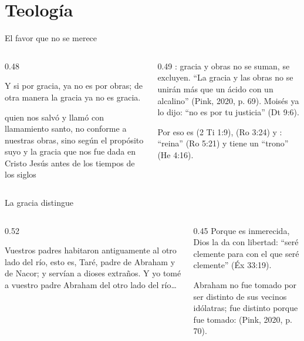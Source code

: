 \section{Teología}

\begin{frame}{El favor que no se merece}
\begin{columns}[t,onlytextwidth]
\begin{column}{0.48\textwidth}
\begin{cita}Y si por gracia, ya no es por obras; de otra manera la gracia ya no es gracia.\end{cita}
\begin{cita}quien nos salvó y llamó con llamamiento santo, no conforme a nuestras obras, sino según el propósito suyo y la gracia que nos fue dada en Cristo Jesús antes de los tiempos de los siglos\end{cita}
\end{column}
\begin{column}{0.49\textwidth}\small
{}: gracia y obras no se suman, se excluyen. ``La gracia y las obras no se unirán más que un ácido con un alcalino'' (Pink, 2020, p. 69). Moisés ya lo dijo: ``no es por tu justicia'' (Dt 9:6).\par\medskip
Por eso es  (2 Ti 1:9),  (Ro 3:24) y : ``reina'' (Ro 5:21) y tiene un ``trono'' (He 4:16).
\end{column}
\end{columns}
\end{frame}

\begin{frame}{La gracia distingue}
\begin{columns}[t,onlytextwidth]
\begin{column}{0.52\textwidth}
\begin{cita}Vuestros padres habitaron antiguamente al otro lado del río, esto es, Taré, padre de Abraham y de Nacor; y servían a dioses extraños. Y yo tomé a vuestro padre Abraham del otro lado del río\ldots{}\end{cita}
\end{column}
\begin{column}{0.45\textwidth}\small
Porque es inmerecida, Dios la da con libertad: ``seré clemente para con el que seré clemente'' (Éx 33:19).\par\medskip
Abraham no fue tomado por ser distinto de sus vecinos idólatras; fue distinto porque fue tomado:  (Pink, 2020, p. 70).
\end{column}
\end{columns}
\end{frame}

